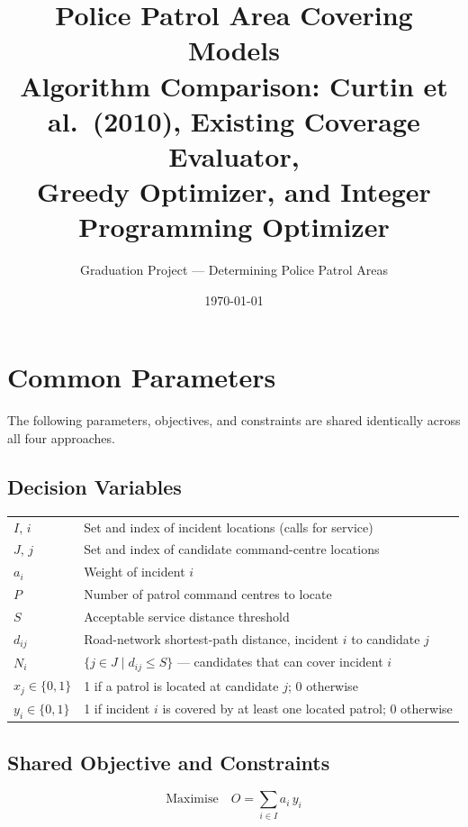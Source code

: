\documentclass[12pt]{article}
\title{\textbf{Police Patrol Area Covering Models}\\[0.4em]
\large Algorithm Comparison: Curtin et al.\ (2010), Existing Coverage Evaluator,\\
Greedy Optimizer, and Integer Programming Optimizer}
\author{Graduation Project --- Determining Police Patrol Areas}
\date{\today}
\begin{document}
\maketitle
\tableofcontents
\newpage

\section{Common Parameters}

The following parameters, objectives, and constraints are shared identically
across all four approaches.

\subsection*{Decision Variables}

\begin{tabular}{@{} l p{11cm} @{}}
$I,\,i$            & Set and index of incident locations (calls for service) \\
$J,\,j$            & Set and index of candidate command-centre locations \\
$a_i$              & Weight of incident $i$ \\
$P$                & Number of patrol command centres to locate \\
$S$                & Acceptable service distance threshold \\
$d_{ij}$           & Road-network shortest-path distance, incident $i$ to candidate $j$ \\
$N_i$              & $\{j \in J \mid d_{ij} \le S\}$ — candidates that can cover incident $i$ \\
$x_j \in \{0,1\}$  & 1 if a patrol is located at candidate $j$; 0 otherwise \\
$y_i \in \{0,1\}$  & 1 if incident $i$ is covered by at least one located patrol; 0 otherwise \\
\end{tabular}

\subsection*{Shared Objective and Constraints}

\begin{equation}
    \text{Maximise} \quad O = \sum_{i \in I} a_i\, y_i
    \label{eq:obj}
\end{equation}
\end{document}

